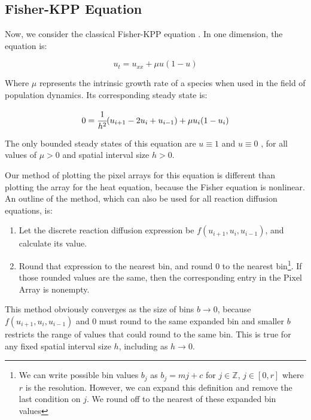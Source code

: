 \documentclass[11pt]{article}
\begin{document}
\subsection{Fisher-KPP Equation}\label{sec:Fisher}

Now, we consider the classical Fisher-KPP equation \citep{Fisher}. In one dimension, the equation is:

\begin{equation}
    \label{Fisher}
    u_t = u_{xx} + \mu u (1-u)
\end{equation}

\noindent Where $\mu$ represents the intrinsic growth rate of a species \citep{Numerical_RD_1} when used in the field of population dynamics. Its corresponding steady state is:

\begin{equation}
    \label{discrete Fisher}
    0 = \cfrac{1}{h^2} (u_{i+1} - 2u_i + u_{i-1}) + \mu u_i (1-u_i)
\end{equation}

\noindent The only bounded steady states of this equation are $u \equiv 1$ and $u \equiv 0$ \citep{Fisher}, for all values of $\mu > 0$ and spatial interval size $h > 0$.

Our method of plotting the pixel arrays for this equation is different than plotting the array for the heat equation, because the Fisher equation is nonlinear. An outline of the method, which can also be used for all reaction diffusion equations, is:

\begin{enumerate}
    \item Let the discrete reaction diffusion expression be $f(u_{i+1}, u_i, u_{i-1})$, and calculate its value.
    \item  Round that expression to the nearest bin, and round 0 to the nearest bin\footnote{We can write possible bin values $b_j$ as $b_j = mj + c$ for $j \in \mathbb{Z}$, $j \in [0,r]$ where $r$ is the resolution. However, we can expand this definition and remove the last condition on $j$. We round off to the nearest of these expanded bin values}. If those rounded values are the same, then the corresponding entry in the Pixel Array is nonempty.
\end{enumerate}

This method obviously converges as the size of bins $b \rightarrow 0$, because $f(u_{i+1}, u_i, u_{i-1})$ and 0 must round to the same expanded bin and smaller $b$ restricts the range of values that could round to the same bin. This is true for any fixed spatial interval size $h$, including as $h \rightarrow 0$.
\end{document}
